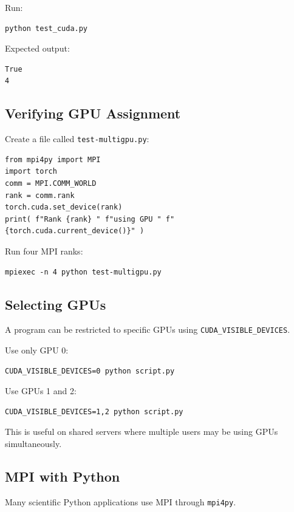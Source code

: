 Run: 

\begin{lstlisting} 
python test_cuda.py 
\end{lstlisting} 

Expected output: 
\begin{lstlisting} 
True 
4 
\end{lstlisting}

\subsection{Verifying GPU Assignment} 

Create a file called \texttt{test-multigpu.py}: 

\begin{lstlisting} 
from mpi4py import MPI 
import torch 
comm = MPI.COMM_WORLD 
rank = comm.rank 
torch.cuda.set_device(rank) 
print( f"Rank {rank} " f"using GPU " f"
{torch.cuda.current_device()}" ) 
\end{lstlisting}

Run four MPI ranks: 

\begin{lstlisting} 
mpiexec -n 4 python test-multigpu.py 
\end{lstlisting}

\subsection{Selecting GPUs} 

A program can be restricted to specific GPUs using \texttt{CUDA\_VISIBLE\_DEVICES}. 

Use only GPU 0: 

\begin{lstlisting} 
CUDA_VISIBLE_DEVICES=0 python script.py 
\end{lstlisting} 

Use GPUs 1 and 2: 

\begin{lstlisting} 
CUDA_VISIBLE_DEVICES=1,2 python script.py 
\end{lstlisting} 

This is useful on shared servers where multiple users may be using GPUs simultaneously. 

\subsection{MPI with Python} 

Many scientific Python applications use MPI through \texttt{mpi4py}. 

